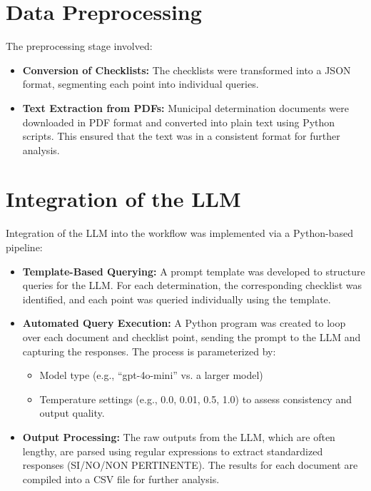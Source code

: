 \documentclass[../main.tex]{subfiles}
\begin{document}
\section{Data Preprocessing}
The preprocessing stage involved:

\begin{itemize}
    \item \textbf{Conversion of Checklists:}
 The checklists were transformed into a JSON format, segmenting each point into individual queries.
    \item \textbf{Text Extraction from PDFs:}
 Municipal determination documents were downloaded in PDF format and converted into plain text using Python scripts. This ensured that the text was in a consistent format for further analysis.
\end{itemize}
 

\section{Integration of the LLM}
Integration of the LLM into the workflow was implemented via a Python-based pipeline:

\begin{itemize}
    \item \textbf{Template-Based Querying:}
 A prompt template was developed to structure queries for the LLM. For each determination, the corresponding checklist was identified, and each point was queried individually using the template.
    \item \textbf{Automated Query Execution:}
 A Python program was created to loop over each document and checklist point, sending the prompt to the LLM and capturing the responses. The process is parameterized by:
    \begin{itemize}
        \item Model type (e.g., “gpt-4o-mini” vs. a larger model)
        \item Temperature settings (e.g., 0.0, 0.01, 0.5, 1.0) to assess consistency and output quality.
    \end{itemize}
    \item \textbf{Output Processing:}
 The raw outputs from the LLM, which are often lengthy, are parsed using regular expressions to extract standardized responses (SI/NO/NON PERTINENTE). The results for each document are compiled into a CSV file for further analysis.
\end{itemize}
\end{document}
